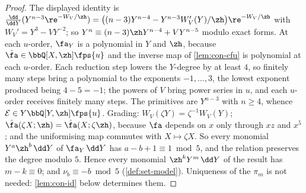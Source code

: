 \begin{proof}
The displayed identity is $\frac{\dd}{\dd Y}(Y^{n-3}\re^{-W_V/\zh})=\bigl((n-3)Y^{n-4}-Y^{n-3}W_V'(Y)/\zh\bigr)\re^{-W_V/\zh}$ with $W_V'=Y^3-VY^{-2}$; so $Y^n\equiv(n-3)\zh Y^{n-4}+VY^{n-5}$ modulo exact forms. At each $u$-order, $\fa_Y$ is a polynomial in $Y$ and $\zh$, because $\hat\fa\in\bbQ[X,\zh]\fps{u}$ and the inverse map of \cref{lem:con-cfu} is polynomial at each $u$-order. Each reduction step lowers the $Y$-degree by at least $4$, so finitely many steps bring a polynomial to the exponents $-1,\dots,3$, the lowest exponent produced being $4-5=-1$; the powers of $V$ bring power series in $u$, and each $u$-order receives finitely many steps. The primitives are $Y^{n-3}$ with $n\geq4$, whence $\mathcal E\in Y\bbQ[Y,\zh]\fps{u}$. Grading: $W_V(\zeta Y)=\zeta^{-1}W_V(Y)$; $\hat\fa(\zeta X;\zh)=\hat\fa(X;\zeta\zh)$, because $\fa$ depends on $x$ only through $xz$ and $x^5$; and the uniformising map commutes with $X\mapsto\zeta X$. So every monomial $Y^a\zh^b\,\dd Y$ of $\fa_Y\,\dd Y$ has $a-b+1\equiv1\bmod5$, and the relation preserves the degree modulo $5$. Hence every monomial $\zh^kY^m\,\dd Y$ of the result has $m-k\equiv0$; and $\nu_b\equiv-b\bmod5$ (\cref{def:set-model}). Uniqueness of the $\pi_m$ is not needed: \cref{lem:con-id} below determines them.
\end{proof}


